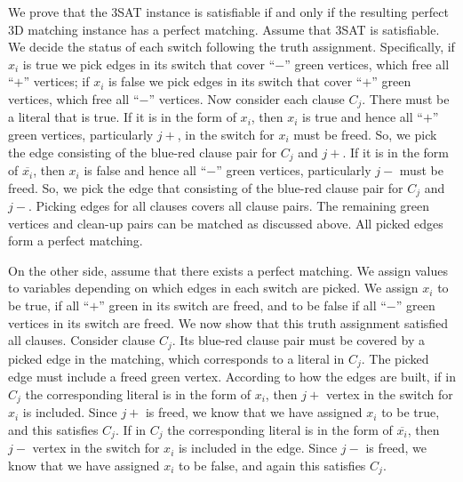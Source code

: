 We prove that the 3SAT instance is satisfiable if and only if the resulting perfect 3D matching instance has a perfect matching.
Assume that 3SAT is satisfiable. We decide the status of each switch
following the truth assignment. Specifically, if $x_i$ is true 
we pick edges in its switch that cover ``$-$'' green vertices, which free all ``$+$'' vertices;
if $x_i$ is false
we pick edges in its switch that cover ``$+$'' green vertices, which free all ``$-$'' vertices.
Now consider each clause $C_j$. There must be a literal that is true.
If it is in the form of $x_i$, then $x_i$ is true and hence all ``$+$'' green vertices, 
particularly $j+$, in the switch for $x_i$ must be freed.
So, we pick the edge consisting of the blue-red clause pair for $C_j$ and $j+$.
If it is in the form of $\overline{x_i}$, then $x_i$ is false and hence all ``$-$'' green vertices, 
particularly $j-$ must be freed.
So, we pick the edge that consisting of the blue-red clause pair for $C_j$ and $j-$.
Picking edges for all clauses covers all clause pairs.
The remaining green vertices and clean-up pairs can be matched as discussed above.
All picked edges form a perfect matching.

On the other side, assume that there exists a perfect matching.
We assign values to variables depending on
which edges in each switch are picked. %
We assign $x_i$ to be true, if all ``$+$'' green in its switch are freed, 
and to be false if all ``$-$'' green vertices in its switch are freed.
We now show that this truth assignment satisfied all clauses.
Consider clause $C_j$. Its blue-red clause pair must be covered by a picked edge in the matching, which corresponds to a literal in $C_j$.
The picked edge must include a freed green vertex. According to how the edges are built, 
if in $C_j$ the corresponding literal is in the form of $x_i$, then $j+$ vertex in the switch for $x_i$ is included.
Since $j+$ is freed, we know that we have assigned $x_i$ to be true, and this satisfies $C_j$.
If in $C_j$ the corresponding literal is in the form of $\overline{x_i}$, then $j-$ vertex in the switch for $x_i$ is included in the edge.
Since $j-$ is freed, we know that we have assigned $x_i$ to be false, and again this satisfies $C_j$.
